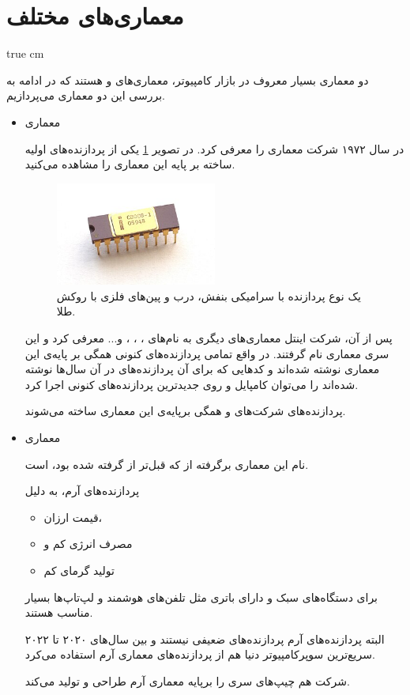 \documentclass[11pt, twoside]{imsproc}
\begin{document}
\section{معماری‌‌های مختلف}
 true cm

دو معماری بسیار معروف در بازار کامپیوتر، معماری‌های 
و 
هستند که در ادامه به بررسی این دو معماری می‌پردازیم.

\begin{itemize}
\item معماری 

در سال ۱۹۷۲ شرکت 
معماری 
را معرفی کرد. در تصویر
\ref{fig:8008}
یکی از پردازنده‌های اولیه ساخته بر پایه این معماری را مشاهده می‌کنید.

\begin{figure}[b]
\begin{center}
\includegraphics[width=0.5\textwidth, height=0.3\textheight]{images/8008}
\end{center}
\caption{یک نوع پردازنده  با سرامیکی بنفش، درب و پین‌های فلزی با روکش طلا.}
\label{fig:8008}
\end{figure}
پس از آن، شرکت اینتل معماری‌های دیگری به نام‌های 
،
،
،
و... معرفی کرد و این سری معماری 
نام گرفتند. در واقع تمامی پردازنده‌های کنونی همگی بر پایه‌ی این معماری نوشته شده‌اند و کد‌‌هایی که برای آن پردازنده‌های در آن سال‌ها نوشته شده‌اند را می‌توان کامپایل و روی جدیدترین پردازنده‌های کنونی اجرا کرد.

پردازنده‌های شرکت‌های 
و 
همگی برپایه‌ی این معماری ساخته می‌شوند.
\item معماری 

نام این معماری برگرفته از 
که قبل‌تر از 
گرفته شده‌ بود، است.

پردازنده‌های آرم، به دلیل
\begin{itemize}
\item 
قیمت ارزان،
\item 
مصرف انرژی کم و
\item 
تولید گرمای کم
\end{itemize}
برای دستگاه‌های سبک و دارای باتری مثل تلفن‌‌های هوشمند و لپ‌تاپ‌ها بسیار مناسب هستند.

البته پردازنده‌های آرم پردازنده‌های ضعیفی نیستند و بین سال‌‌های ۲۰۲۰ تا ۲۰۲۲ سریع‌ترین سوپرکامپیوتر دنیا 
هم از پردازنده‌های معماری آرم استفاده می‌کرد.

شرکت 
هم چیپ‌های سری  را برپایه معماری آرم طراحی و تولید می‌کند.
\end{itemize}
\end{document}
